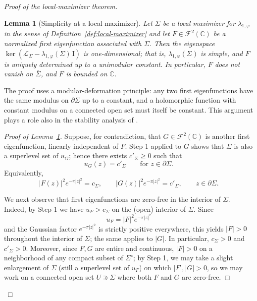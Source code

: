 \documentclass[a4paper,11pt,reqno]{amsart}
\numberwithin{equation}{section}
\theoremstyle{plain} %
\newtheorem{lemma}{Lemma}[section]
\theoremstyle{definition} %
\theoremstyle{remark}
\newcommand{\C}{\mathbb{C}}
\begin{document}
\begin{proof}[Proof of the local-maximizer theorem]
\begin{lemma}[Simplicity at a local maximizer]\label{lem:simplicity-local-max}
Let \(\Sigma\) be a local maximizer for \(\lambda_{1,\varphi}\) in the sense
of Definition~\ref{def:local-maximizer} and let \(F\in\mathcal F^2(\C)\) be a
normalized first eigenfunction associated with \(\Sigma\). Then the
eigenspace \(\ker(\mathcal L_\Sigma-\lambda_{1,\varphi}(\Sigma)\,\mathrm I)\)
is one-dimensional; that is, \(\lambda_{1,\varphi}(\Sigma)\) is simple, and
\(F\) is uniquely determined up to a unimodular constant. In particular,
\(F\) does not vanish on \(\overline\Sigma\), and \(F\) is bounded on \(\C\).
\end{lemma}

The proof uses a modular-deformation principle: any two first eigenfunctions
have the same modulus on \(\partial\Sigma\) up to a constant, and a holomorphic
function with constant modulus on a connected open set must itself be constant.
This argument plays a role also in the stability analysis of
\cite{Gomez-Guerra-Ramos-Tilli}.

\begin{proof}[Proof of Lemma~\ref{lem:simplicity-local-max}]
Suppose, for contradiction, that \(G\in \mathcal F^2(\C)\) is another first
eigenfunction, linearly independent of \(F\). Step 1 applied to \(G\) shows that
\(\Sigma\) is also a superlevel set of \(u_G\); hence there exists
\(c'_\Sigma\ge 0\) such that
\[
u_G(z)=c'_\Sigma
\qquad\text{for } z\in \partial \Sigma.
\]
Equivalently,
\[
|F(z)|^2 e^{-\pi |z|^2}=c_\Sigma,
\qquad
|G(z)|^2 e^{-\pi |z|^2}=c'_\Sigma,
\qquad z\in \partial \Sigma.
\]

We next observe that first eigenfunctions are zero-free in the interior of
\(\Sigma\). Indeed, by Step 1 we have \(u_F>c_\Sigma\) on the (open) interior of
\(\Sigma\). Since
\[
u_F=|F|^2 e^{-\pi |z|^2}
\]
and the Gaussian factor \(e^{-\pi|z|^2}\) is strictly positive everywhere, this
yields \(|F|>0\) throughout the interior of \(\Sigma\); the same applies to
\(|G|\). In particular, \(c_\Sigma>0\) and \(c'_\Sigma>0\). Moreover, since
\(F,G\) are entire and continuous, \(|F|>0\) on a neighborhood of any compact
subset of \(\Sigma^\circ\); by Step 1, we may take a slight enlargement of
\(\Sigma\) (still a superlevel set of \(u_F\)) on which \(|F|,|G|>0\), so we may
work on a connected open set \(U\Supset \Sigma\) where both \(F\) and \(G\) are
zero-free.


\end{proof}
\end{proof}
\end{document}
